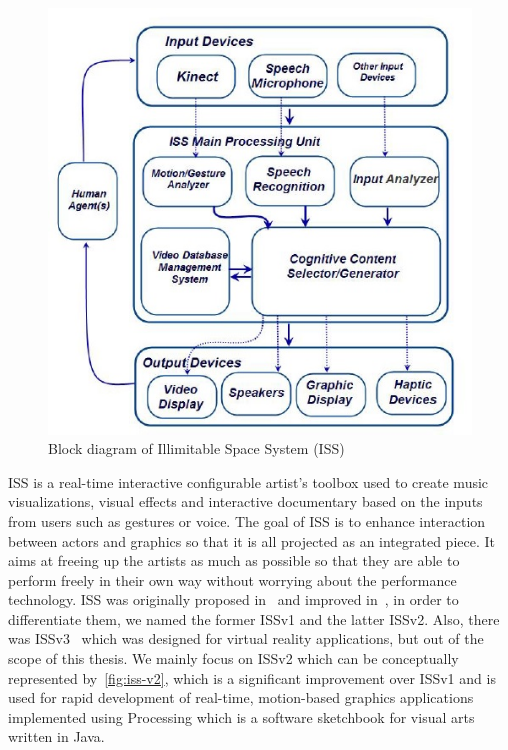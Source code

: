 \begin{figure}
    \begin{center}
        \includegraphics[scale=0.8]{figures/iss_v2_model.jpg}
    \end{center}
    \caption{Block diagram of Illimitable Space System (ISS)}
    \label{fig:iss-v2}
\end{figure}

ISS is a real-time interactive configurable
artist's toolbox used to create music visualizations, visual effects and
interactive documentary based on the inputs from users such as gestures or
voice.
The goal of ISS is to enhance interaction between actors and graphics so that
it is all projected as an integrated piece. It aims at freeing up the artists
as much as possible so that they are able to perform freely in their own way
without worrying about the performance technology.
ISS was originally proposed in~\cite{first-proposed-iss} and improved 
in~\cite{iss-v2-design-theory-journal}, in order to differentiate them, we named
the former ISSv1 and the latter ISSv2. Also, there was 
ISSv3~\cite{iss-v3-appy-hour-gem2015, iss-v3-appy-hour-siggraph2015} which
was designed for virtual reality applications, but out of the scope of this 
thesis. 
We mainly focus on ISSv2 which can be conceptually represented 
by~\autoref{fig:iss-v2}, which is a significant improvement over
ISSv1 and is used
for rapid development of real-time, motion-based graphics applications
implemented using Processing which is a software sketchbook for visual arts written in Java.

